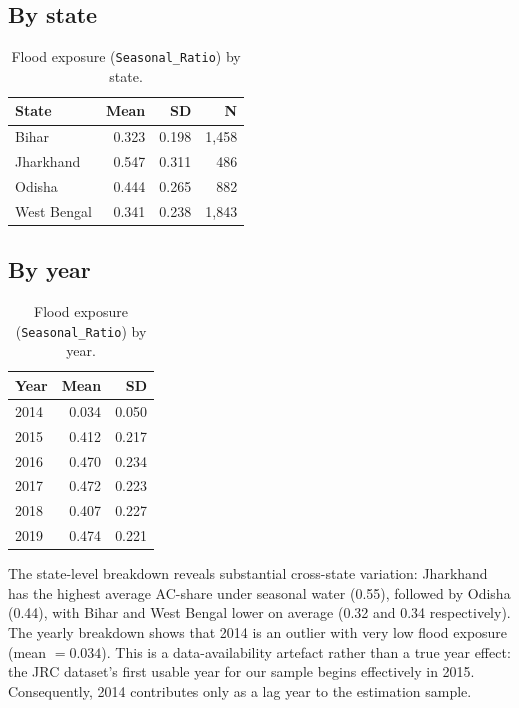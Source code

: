 \documentclass[12pt,a4paper,oneside]{report}
\begin{document}
\subsection*{By state}

\begin{table}[h]
\centering
\caption{Flood exposure (\texttt{Seasonal\_Ratio}) by state.}
\label{tab:flood-state}
\begin{tabular}{lrrr}
\toprule
\textbf{State} & \textbf{Mean} & \textbf{SD} & \textbf{N} \\
\midrule
Bihar       & 0.323 & 0.198 & 1{,}458 \\
Jharkhand   & 0.547 & 0.311 & \phantom{0}486 \\
Odisha      & 0.444 & 0.265 & \phantom{0}882 \\
West Bengal & 0.341 & 0.238 & 1{,}843 \\
\bottomrule
\end{tabular}
\end{table}

\subsection*{By year}

\begin{table}[h]
\centering
\caption{Flood exposure (\texttt{Seasonal\_Ratio}) by year.}
\label{tab:flood-year}
\begin{tabular}{lrr}
\toprule
\textbf{Year} & \textbf{Mean} & \textbf{SD} \\
\midrule
2014 & 0.034 & 0.050 \\
2015 & 0.412 & 0.217 \\
2016 & 0.470 & 0.234 \\
2017 & 0.472 & 0.223 \\
2018 & 0.407 & 0.227 \\
2019 & 0.474 & 0.221 \\
\bottomrule
\end{tabular}
\end{table}

The state-level breakdown reveals substantial cross-state variation: Jharkhand has the highest average AC-share under seasonal water (0.55), followed by Odisha (0.44), with Bihar and West Bengal lower on average (0.32 and 0.34 respectively). The yearly breakdown shows that 2014 is an outlier with very low flood exposure (mean $= 0.034$). This is a data-availability artefact rather than a true year effect: the JRC dataset's first usable year for our sample begins effectively in 2015. Consequently, 2014 contributes only as a lag year to the estimation sample.
\end{document}
